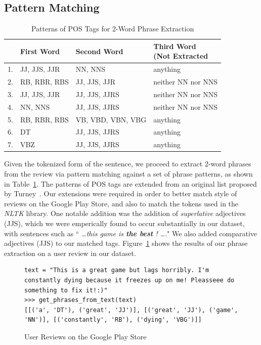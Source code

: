 \documentclass[11pt]{report} %
\begin{document}
\subsection{Pattern Matching}
\begin{table}[h]
	\centering
    \begin{tabular}{  l  l  l  l}
    \hline\hline
    	 & First Word & Second Word & \shortstack{Third Word \\ (Not Extracted} \\ \hline
	1. & JJ, JJS, JJR & NN, NNS & anything \\ \hline
	2. & RB, RBR, RBS &JJ, JJS, JJR & neither NN nor NNS \\ \hline
	3. & JJ, JJS, JJR & JJ, JJS, JJRS & neither NN nor NNS \\ \hline
	4. & NN, NNS & JJ, JJS, JJRS & neither NN nor NNS \\ \hline
	5. & RB, RBR, RBS &VB, VBD, VBN, VBG & anything \\ \hline
	6. & DT & JJ, JJS, JJRS & anything \\ \hline
	7. & VBZ & JJ, JJS, JJRS & anything \\ \hline
    \hline
    \end{tabular}
\caption{Patterns of POS Tags for 2-Word Phrase Extraction}
\label{fig:postags}
\end{table}

Given the tokenized form of the sentence, we proceed to extract 2-word phrases from the review via pattern matching against a set of phrase patterns, as shown in Table~\ref{fig:postags}. The patterns of POS tags are extended from an original list proposed by Turney~\cite{Turney2001}. Our extensions were required in order to better match style of reviews on the Google Play Store, and also to match the tokens used in the \textit{NLTK} library. One notable addition was the addition of \textit{superlative} adjectives (JJS), which we were emperically found to occur substantially in our dataset, with sentences such as `` \textit{\dots this game is \textbf{the best} ! \dots}." We also added comparative adjectives (JJS) to our matched tags. Figure~\ref{fig:phrase_extraction} shows the results of our phrase extraction on a user review in our dataset.

\begin{figure}[h!]
  \centering
\begin{lstlisting}
text = "This is a great game but lags horribly. I'm constantly dying because it freezes up on me! Pleasseee do something to fix it!:)"
>>> get_phrases_from_text(text)
[[('a', 'DT'), ('great', 'JJ')], [('great', 'JJ'), ('game', 'NN')], [('constantly', 'RB'), ('dying', 'VBG')]]

\end{lstlisting}
 \caption{User Reviews on the Google Play Store}
\label{fig:phrase_extraction}
\end{figure}
\end{document}

